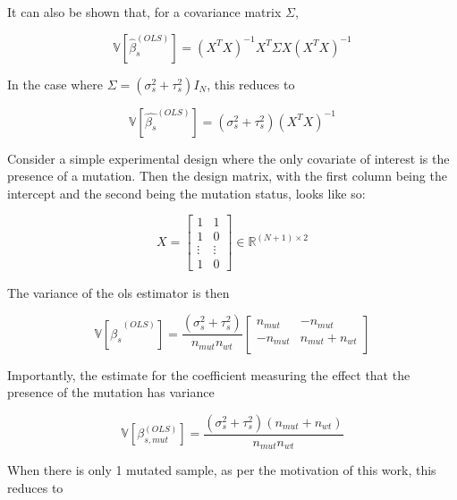 It can also be shown that, for a covariance matrix $\Sigma$,

\begin{equation*}
  \mathbb{V} \left[ \hat{\beta}_s^{(OLS)} \right] = (X^TX)^{-1} X^T \Sigma X (X^TX)^{-1}
\end{equation*}

In the case where $\Sigma = (\sigma_s^2 + \tau_s^2)I_N$, this reduces to

\begin{equation*}
  \mathbb{V} \left[ \hat{\beta_s}^{(OLS)} \right] = (\sigma_s^2 + \tau_s^2)(X^TX)^{-1}
\end{equation*}

Consider a simple experimental design where the only covariate of interest is the presence of a mutation.
Then the design matrix, with the first column being the intercept and the second being the mutation status, looks like so:

\begin{equation*}
  X = \begin{bmatrix}
  1 & 1 \\
  1 & 0 \\
  \vdots & \vdots \\
  1 & 0
  \end{bmatrix}
\in \mathbb{R}^{(N + 1) \times 2}
\end{equation*}

The variance of the \gls{ols} estimator is then

\begin{equation*}
  \mathbb{V} \left[ \hat{\beta_s}^{(OLS)} \right] = \frac{(\sigma_s^2 + \tau_s^2)}{n_{mut} n_{wt}}
  \begin{bmatrix}
    n_{mut} & -n_{mut} \\
    - n_{mut} & n_{mut} + n_{wt} \\
  \end{bmatrix}
\end{equation*}

Importantly, the estimate for the coefficient measuring the effect that the presence of the mutation has variance

\begin{equation*}
  \mathbb{V} \left[\beta_{s, mut}^{(OLS)} \right] = \frac{(\sigma_s^2 + \tau_s^2)(n_{mut} + n_{wt})}{n_{mut} n_{wt}}
\end{equation*}

When there is only 1 mutated sample, as per the motivation of this work, this reduces to

